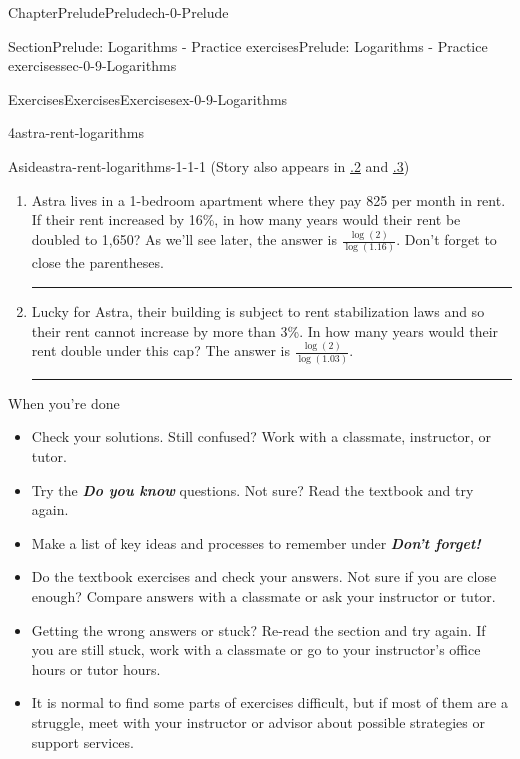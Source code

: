 \documentclass[twoside,11pt,]{book}
\newcommand{\xreffont}{\relax}
\newcommand{\alert}[1]{\textbf{\textit{#1}}}
\newlength{\workspacestrutwidth}
\numberwithin{equation}{section}
\begin{document}
\begin{chapterptx}{Chapter}{Prelude}{}{Prelude}{}{}{ch-0-Prelude}
\begin{sectionptx}{Section}{Prelude: Logarithms - Practice exercises}{}{Prelude: Logarithms - Practice exercises}{}{}{sec-0-9-Logarithms}
\begin{exercises-subsection-numberless}{Exercises}{Exercises}{}{Exercises}{}{}{ex-0-9-Logarithms}
\begin{divisionexercise}{4}{}{}{astra-rent-logarithms}
\begin{aside}{Aside}{}{astra-rent-logarithms-1-1-1}
(Story also appears in \hyperlink{astra-rent-percentages}{{\xreffont 0.3.2}} and \hyperlink{astra-rent-algebraic-notation}{{\xreffont 0.7.3}})%
\end{aside}
%
\begin{enumerate}[label=(\alph*),ref=\alph*]%
\item{}Astra lives in a 1-bedroom apartment where they pay \textdollar{}825 per month in rent. If their rent increased by 16\%, in how many years would their rent be doubled to \textdollar{}1,650? As we'll see later, the answer is \(\displaystyle \frac{\log(2)}{\log(1.16)}\). Don't forget to close the parentheses.%
\par\rule{\workspacestrutwidth}{0.4in}%
\item{}Lucky for Astra, their building is subject to rent stabilization laws and so their rent cannot increase by more than 3\%. In how many years would their rent double under this cap? The answer is \(\displaystyle \frac{\log(2)}{\log(1.03)}\).%
\par\rule{\workspacestrutwidth}{0.5in}%
\end{enumerate}%
\end{divisionexercise}%
\end{exercises-subsection-numberless}
\begin{conclusion}{When you're done \textellipsis{}}%
%
\begin{itemize}[label=\textbullet]
\item{}Check your solutions. Still confused? Work with a classmate, instructor, or tutor.%
\item{}Try the \alert{Do you know} questions. Not sure? Read the textbook and try again.%
\item{}Make a list of key ideas and processes to remember under \alert{Don't forget!}%
\item{}Do the textbook exercises and check your answers. Not sure if you are close enough? Compare answers with a classmate or ask your instructor or tutor.%
\item{}Getting the wrong answers or stuck? Re-read the section and try again. If you are still stuck, work with a classmate or go to your instructor's office hours or tutor hours.%
\item{}It is normal to find some parts of exercises difficult, but if most of them are a struggle, meet with your instructor or advisor about possible strategies or support services.%
\end{itemize}
%
\end{conclusion}%

\end{sectionptx}
\end{chapterptx}
\end{document}
